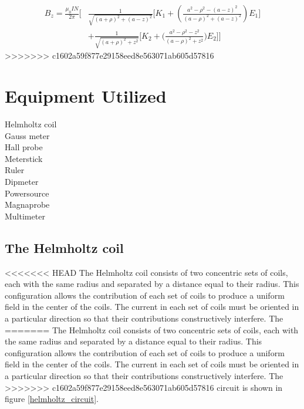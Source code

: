 \documentclass[a4paper]{article}
\begin{document}
\begin{align} 
    B_z = \frac{\mu_0IN}{2\pi}
    \Big[&
        \frac{1}{\sqrt{(a+\rho)^2 + (a-z)^2}}
        \big[
            K_1 + \left(\frac{a^2 -\rho^2 - (a - z)^2}{(a-\rho)^2 + (a - z)^2} \right) E_1 
        \big] \label{eq:longBiotSavart} \\
            & + \frac{1}{\sqrt{(a + \rho)^2 + z^2}}
        \big[
            K_2 + \big(\frac{a^2 - \rho^2 - z^2}{(a - \rho)^2 + z^2}\big) E_2 
        \big] 
    \Big] \nonumber
\end{align}
>>>>>>> c1602a59f877e29158eed8e563071ab605d57816

\section{Equipment Utilized}


Helmholtz coil \\
Gauss meter \\
Hall probe \\
Meterstick \\
Ruler \\
Dipmeter \\
Powersource \\
Magnaprobe \\
Multimeter\\

\subsection{The Helmholtz coil}

<<<<<<< HEAD
The Helmholtz coil consists of two concentric sets of coils, each with
the same radius and separated by a distance equal to their
radius. This configuration allows the contribution of each set of
coils to produce a uniform field in the center of the coils. The
current in each set of coils must be oriented in a particular
direction so that their contributions constructively interfere. The
=======
\qq The Helmholtz coil consists of two concentric sets of coils, each with the same
radius and separated by a distance equal to their radius. This configuration
allows the contribution of each set of coils to produce a uniform field in the
center of the coils. The current in each set of coils must be oriented in a
particular direction so that their contributions constructively interfere. The
>>>>>>> c1602a59f877e29158eed8e563071ab605d57816
circuit is shown in figure \ref{helmholtz_circuit}.
\end{document}
